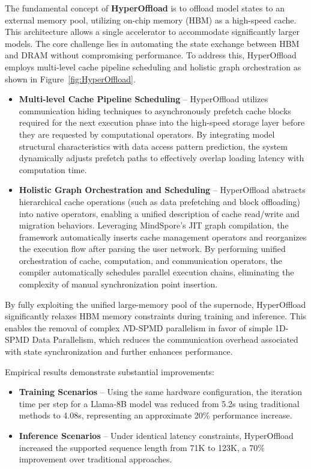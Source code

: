 \documentclass[11pt]{article}
\begin{document}
The fundamental concept of \textbf{HyperOffload} is to offload model states to an external memory pool, utilizing on-chip memory (HBM) as a high-speed cache. This architecture allows a single accelerator to accommodate significantly larger models. The core challenge lies in automating the state exchange between HBM and DRAM without compromising performance. To address this, HyperOffload employs multi-level cache pipeline scheduling and holistic graph orchestration as shown in Figure~\ref{fig:HyperOffload}.

\begin{itemize}
    \item \textbf{Multi-level Cache Pipeline Scheduling} – HyperOffload utilizes communication hiding techniques to asynchronously prefetch cache blocks required for the next execution phase into the high-speed storage layer before they are requested by computational operators. By integrating model structural characteristics with data access pattern prediction, the system dynamically adjusts prefetch paths to effectively overlap loading latency with computation time.
    \item \textbf{Holistic Graph Orchestration and Scheduling} – HyperOffload abstracts hierarchical cache operations (such as data prefetching and block offloading) into native operators, enabling a unified description of cache read/write and migration behaviors. Leveraging MindSpore’s JIT graph compilation, the framework automatically inserts cache management operators and reorganizes the execution flow after parsing the user network. By performing unified orchestration of cache, computation, and communication operators, the compiler automatically schedules parallel execution chains, eliminating the complexity of manual synchronization point insertion.
\end{itemize}



By fully exploiting the unified large-memory pool of the supernode, HyperOffload significantly relaxes HBM memory constraints during training and inference. This enables the removal of complex $N$D-SPMD parallelism in favor of simple 1D-SPMD Data Parallelism, which reduces the communication overhead associated with state synchronization and further enhances performance.

Empirical results demonstrate substantial improvements:
\begin{itemize}
    \item \textbf{Training Scenarios} – Using the same hardware configuration, the iteration time per step for a Llama-8B model was reduced from 5.2s using traditional methods to 4.08s, representing an approximate 20\% performance increase.
    \item \textbf{Inference Scenarios} – Under identical latency constraints, HyperOffload increased the supported sequence length from 71K to 123K, a 70\% improvement over traditional approaches.
\end{itemize}
\end{document}
